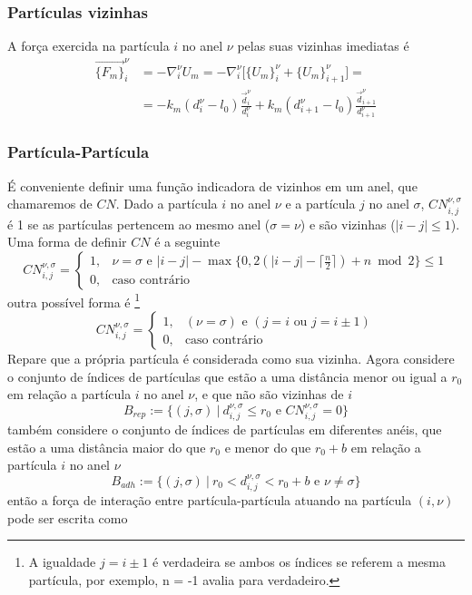\documentclass{article}
\theoremstyle{definition}
\def \quantity#1#2#3{\vec{#1}_{#2}^{#3}}
\def \quantitysc#1#2#3{{#1}_{#2}^{#3}}
\def \quantitygsc#1#2#3#4#5{{#1}_{#2, #3}^{#4, #5}}
\def \desloc#1#2{\quantity{d}{#1}{#2}}
\def \deslocsc#1#2{\quantitysc{d}{#1}{#2}}
\def \deslocgsc#1#2#3#4{\quantitygsc{d}{#1}{#2}{#3}{#4}}
\begin{document}
\subsubsection{Partículas vizinhas}
A força exercida na partícula $i$ no anel $\nu$ pelas suas vizinhas imediatas é
\begin{equation}
\begin{aligned}
    \quantity{\{F_m\}}{i}{\nu} &= -\quantitysc{\nabla}{i}{\nu}U_m = -\quantitysc{\nabla}{i}{\nu}\bigg[\quantitysc{\{U_m\}}{i}{\nu} + \quantitysc{\{U_m\}}{i+1}{\nu} \bigg] = \\ 
    &= -k_m (\deslocsc{i}{\nu} -l_0)\frac{\desloc{i}{\nu}}{\deslocsc{i}{\nu}} + k_m (\deslocsc{i+1}{\nu} -l_0)\frac{\desloc{i+1}{\nu}}{\deslocsc{i+1}{\nu}}
\end{aligned}
\label{eq:force_spring}
\end{equation}

\subsubsection{Partícula-Partícula}
É conveniente definir uma função indicadora de vizinhos em um anel, que chamaremos de $CN$. Dado a partícula $i$ no anel $\nu$ e a partícula $j$ no anel $\sigma$,  $CN_{i, j}^{\nu, \sigma}$ é 1 se as partículas pertencem ao mesmo anel ($\sigma = \nu$) e são vizinhas ($|i - j| \leq 1$). Uma forma de definir $CN$ é a seguinte
\begin{equation}
    CN_{i, j}^{\nu, \sigma} = \begin{cases}
        1,& \nu = \sigma \text{ e } |i - j| - \max\{0,  2(|i-j| - \lceil \frac{n}{2} \rceil) + n\bmod2 \} \leq 1 \\
        0,& \text{caso contrário}
    \end{cases}
\label{eq:close_neihbors}
\end{equation}
outra possível forma é \footnote{A igualdade $j=i\pm 1$ é verdadeira se ambos os índices se referem a mesma partícula, por exemplo, n = -1 avalia para verdadeiro.}
\[
CN_{i, j}^{\nu, \sigma} = \begin{cases}
        1,& (\nu = \sigma) \text{ e } (j=i \text{ ou } j = i \pm 1) \\
        0,& \text{caso contrário}
    \end{cases}
\]
Repare que a própria partícula é considerada como sua vizinha. Agora considere o conjunto de índices de partículas que estão a uma distância menor ou igual a $r_0$ em relação a partícula $i$ no anel $\nu$, e que não são vizinhas de $i$ 
\[
B_{rep} := \{(j, \sigma)~|~ \deslocgsc{i}{j}{\nu}{\sigma} \leq r_0 \text{ e } CN_{i, j}^{\nu, \sigma} = 0 \}
\]
também considere o conjunto de índices de partículas em diferentes anéis, que estão a uma distância maior do que $r_0$ e menor do que $r_0 + b$ em relação a partícula $i$ no anel $\nu$
\[
B_{adh} := \{(j, \sigma)~|~ r_0 < \deslocgsc{i}{j}{\nu}{\sigma} < r_0+b \text{ e } \nu \neq \sigma\}
\]
então a força de interação entre partícula-partícula atuando na partícula $(i, \nu)$ pode ser escrita como
\end{document}

